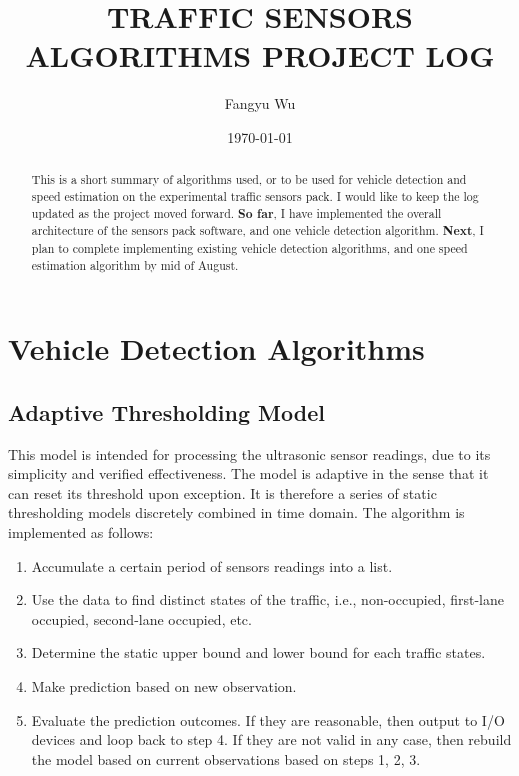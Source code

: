 \documentclass[letter]{article}
\title{TRAFFIC SENSORS ALGORITHMS PROJECT LOG}
\author{Fangyu Wu}
\date{\today}
\begin{document}
\maketitle

\begin{abstract}
This is a short summary of algorithms used, or to be used for vehicle detection and speed estimation on the experimental traffic sensors pack. I would like to keep the log updated as the project moved forward. \textbf{So far}, I have implemented the overall architecture of the sensors pack software, and one vehicle detection algorithm. \textbf{Next}, I plan to complete implementing existing vehicle detection algorithms, and one speed estimation algorithm by mid of August.
\end{abstract}


\section{Vehicle Detection Algorithms}

\subsection{Adaptive Thresholding Model}
This model is intended for processing the ultrasonic sensor readings, due to its simplicity and verified effectiveness. The model is adaptive in the sense that it can reset its threshold upon exception. It is therefore a series of static thresholding models discretely combined in time domain. The algorithm is implemented as follows:
\begin{enumerate}
\item Accumulate a certain period of sensors readings into a list.
\item Use the data to find distinct states of the traffic, i.e., non-occupied, first-lane occupied, second-lane occupied, etc.
\item Determine the static upper bound and lower bound for each traffic states.
\item Make prediction based on new observation.
\item Evaluate the prediction outcomes. If they are reasonable, then output to I/O devices and loop back to step 4. If they are not valid in any case, then rebuild the model based on current observations based on steps 1, 2, 3.
\end{enumerate}
\end{document}

